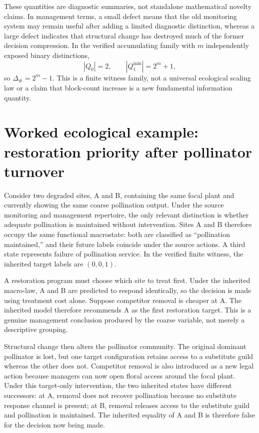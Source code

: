 \documentclass[11pt]{article}
\begin{document}
These quantities are diagnostic summaries, not standalone mathematical novelty claims. In management terms, a small defect means that the old monitoring system may remain useful after adding a limited diagnostic distinction, whereas a large defect indicates that structural change has destroyed much of the former decision compression. In the verified accumulating family with $m$ independently exposed binary distinctions,
\[
|Q_0|=2,\qquad |Q_1^{\min}|=2^m+1,
\]
so $\Delta_{\#}=2^m-1$. This is a finite witness family, not a universal ecological scaling law or a claim that block-count increase is a new fundamental information quantity.

\setcounter{theorem}{4}

\section{Worked ecological example: restoration priority after pollinator turnover}
Consider two degraded sites, A and B, containing the same focal plant and currently showing the same coarse pollination output. Under the source monitoring and management repertoire, the only relevant distinction is whether adequate pollination is maintained without intervention. Sites A and B therefore occupy the same functional macrostate: both are classified as ``pollination maintained,'' and their future labels coincide under the source actions. A third state represents failure of pollination service. In the verified finite witness, the inherited target labels are $(0,0,1)$.

A restoration program must choose which site to treat first. Under the inherited macro-law, A and B are predicted to respond identically, so the decision is made using treatment cost alone. Suppose competitor removal is cheaper at A. The inherited model therefore recommends A as the first restoration target. This is a genuine management conclusion produced by the coarse variable, not merely a descriptive grouping.

Structural change then alters the pollinator community. The original dominant pollinator is lost, but one target configuration retains access to a substitute guild whereas the other does not. Competitor removal is also introduced as a new legal action because managers can now open floral access around the focal plant. Under this target-only intervention, the two inherited states have different successors: at A, removal does not recover pollination because no substitute response channel is present; at B, removal releases access to the substitute guild and pollination is maintained. The inherited equality of A and B is therefore false for the decision now being made.
\end{document}

